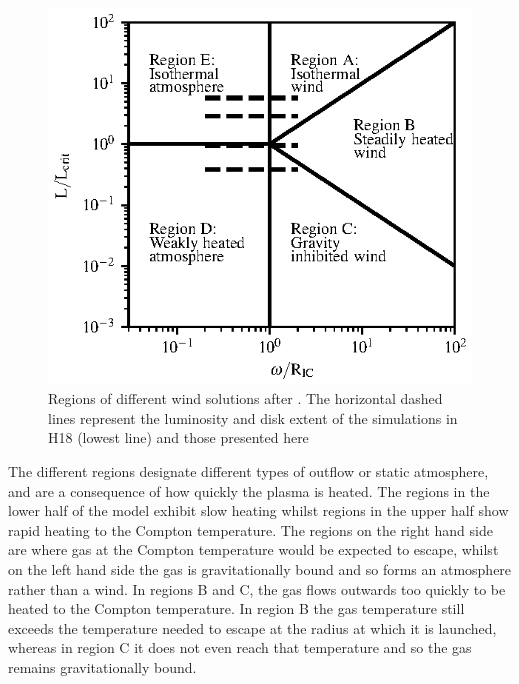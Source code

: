 \documentclass[a4paper,fleqn,usenatbib]{mnras}
\begin{document}
\begin{figure}
\includegraphics[width=\columnwidth]{figures/fig7.eps}
\caption{Regions of different wind solutions after \protect\cite{1983ApJ...271...70B}. The horizontal dashed 
lines represent the luminosity and disk extent of the simulations in H18
(lowest line) and those presented here}
\label{figure:regions}
\end{figure}

The different regions designate different types of outflow or static atmosphere, and are a consequence of
how quickly the plasma is heated. The regions in the lower half of the model exhibit slow heating 
whilst regions in the upper half show rapid heating to the Compton temperature. The regions on the
right hand side are where gas at the Compton temperature would be expected to escape, whilst on the 
left hand side the gas is gravitationally bound and so forms an atmosphere rather than a wind. 
In regions B and C, the gas flows outwards too quickly to be heated to the Compton temperature. In region
B the gas temperature still exceeds the temperature needed to escape at the radius at which it is launched, 
whereas in region C it does not even reach that temperature and so the gas remains gravitationally
bound.
\end{document}
